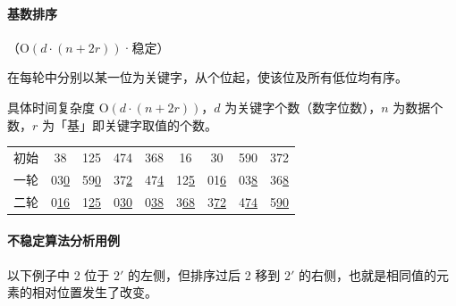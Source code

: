 \documentclass[UTF8]{ctexart}
\renewcommand\O{\mathrm{O}}
\begin{document}
\paragraph{\textcolor{color3}{基数排序}} {\small\textcolor{color3}{（$\O(d\cdot(n+2r))$·稳定）}}

在每轮中分别以某一位为关键字，从个位起，使该位及所有低位均有序。

具体时间复杂度 $\O(d\cdot(n+2r))$，$d$ 为关键字个数（数字位数），$n$ 为数据个数，$r$ 为「基」即关键字取值的个数。

\begin{table}[H]
  \centering
  \begin{tabular}{ccccccccc}
    初始 & 38 & 125 & 474 & 368 & 16 & 30 & 590 & 372 \\
    一轮 & 03\uline{0} & 59\uline{0} & 37\uline{2} & 47\uline{4} & 12\uline{5} & 01\uline{6} & 03\uline{8} & 36\uline{8} \\
    二轮 & 0\uline{16} & 1\uline{25} & 0\uline{30} & 0\uline{38} & 3\uline{68} & 3\uline{72} & 4\uline{74} & 5\uline{90} \\
  \end{tabular}
\end{table}

\paragraph{\textcolor{color3}{不稳定算法分析用例}}
以下例子中 2 位于 $2'$ 的左侧，但排序过后 2 移到 $2'$ 的右侧，也就是相同值的元素的相对位置发生了改变。
\end{document}
